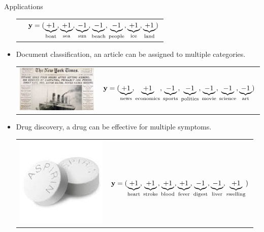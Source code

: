 \documentclass[first=dgreen,second=purple,logo=yellowexc]{aaltoslides}
\begin{document}
\begin{frame}{Applications}
\begin{itemize}
\begin{tabular}{p{3cm}p{10cm}}
		& $\mathbf {y}=(\underbrace{+1}_{\text{boat}},\underbrace{+1}_{\text{sea}},\underbrace{-1}_{\text{sun}},\underbrace{-1}_{\text{beach}},\underbrace{-1}_{\text{people}},\underbrace{+1}_{\text{ice}},\underbrace{+1}_{\text{land}})$\\
        \end{tabular}
		\item Document classification, an article can be assigned to multiple categories.
		\begin{tabular}{p{3cm}p{10cm}} 
        \multirow{2}{*}{\includegraphics[scale = 0.11]{./figures/titanic.jpg}} & \\
		& $\mathbf {y}=(\underbrace{+1}_{\text{news}},\underbrace{+1}_{\text{economics}},\underbrace{-1}_{\text{sports}},\underbrace{-1}_{\text{politics}},\underbrace{-1}_{\text{movie}},\underbrace{-1}_{\text{science}},\underbrace{-1}_{\text{art}})$\\
        \end{tabular}
		\item Drug discovery, a drug can be effective for multiple symptoms.
		\begin{tabular}{p{3cm}p{10cm}} 
        \multirow{2}{*}{\includegraphics[scale = 0.25]{./figures/aspirin.jpg}} & \\
		& $\mathbf {y}=(\underbrace{+1}_{\text{heart}},\underbrace{+1}_{\text{stroke}},\underbrace{+1}_{\text{blood}},\underbrace{+1}_{\text{fever}},\underbrace{-1}_{\text{digest}},\underbrace{-1}_{\text{liver}},\underbrace{+1}_{\text{swelling}})$\\
        \end{tabular}
	\end{itemize}
\end{frame}
\end{document}
